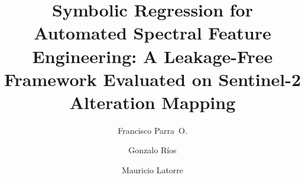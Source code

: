 \documentclass[preprint,authoryear,number]{elsarticle}
\begin{document}
\begin{frontmatter}

\title{Symbolic Regression for Automated Spectral Feature Engineering: A Leakage-Free Framework Evaluated on Sentinel-2 Alteration Mapping}

\author[usach]{Francisco Parra~O.}

\author[dim]{Gonzalo R\'ios}

\author[uoh,systemix,cgr,cmm,inta]{Mauricio Latorre}

\address[usach]{Universidad de Santiago de Chile (USACH), Santiago, Chile}
\address[dim]{Departamento de Ingenier\'ia Matem\'atica, Facultad de Ciencias F\'isicas y Matem\'aticas, Universidad de Chile, Santiago, Chile}
\address[uoh]{Laboratorio de Bioingenier\'ia, Instituto de Ciencias de la Ingenier\'ia, Universidad de O'Higgins, Libertador Bernardo O'Higgins 611, Rancagua, Chile}
\address[systemix]{Centro de Biolog\'ia de Sistemas para el Estudio de Comunidades Extrem\'ofilas de Relaves Mineros (SYSTEMIX), Universidad de O'Higgins, Libertador Bernardo O'Higgins 611, Rancagua, Chile}
\address[cgr]{Millennium Institute Center for Genome Regulation, Santiago 8320165, Regi\'on Metropolitana, Chile}
\address[cmm]{Center for Mathematical Modeling, University of Chile, Beauchef 851, Santiago, Chile}
\address[inta]{Laboratorio de Bioinform\'atica y Expresi\'on G\'enica, INTA, Universidad de Chile, El L\'ibano 5524, Macul, Santiago, Chile}


\end{frontmatter}
\end{document}
